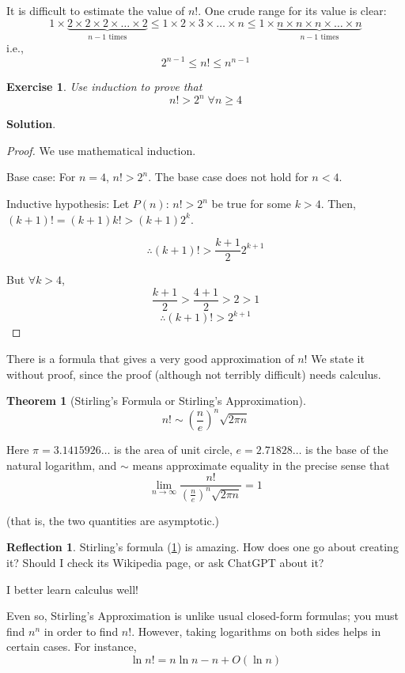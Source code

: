 \documentclass[11pt]{book}
\theoremstyle{definition}
\theoremstyle{plain}
\newtheorem{theorem}{Theorem}
\newtheorem{exercise}{Exercise}
\theoremstyle{definition}
\theoremstyle{problemstyle}
\theoremstyle{remark}
\theoremstyle{definition}
\newtheorem{reflection}{Reflection}
\begin{document}
It is difficult to estimate the value of $n!$. One crude range for its value is clear:
\[
    1\times\underbrace{2\times2\times2\times\dots\times2}_{n-1\text{ times}}\leq1\times2\times3\times\dots\times n\leq 1\times\underbrace{n\times n\times n\times\dots\times n}_{n-1\text{ times}}
\]
i.e.,
\[
    2^{n-1}\leq n!\leq n^{n-1}
\]
\begin{exercise}
    \label{ex:2.2.2}
    Use induction to prove that
    \[
        n!>2^n\;\forall n\geq4
    \]
\end{exercise}
\textbf{Solution}.
\begin{proof}
    We use mathematical induction.

    Base case: For $n=4$, $n!>2^n$. The base case does not hold for $n<4$.

    Inductive hypothesis: Let $P(n)$: $n!>2^n$ be true for some $k>4$. Then, $(k+1)!=(k+1)k!>(k+1)2^k$.

    \[
        \therefore(k+1)!>\frac{k+1}{2}2^{k+1}
     \]

     But $\forall k>4$, 
     \[
         \frac{k+1}{2}>\frac{4+1}{2}>2>1
     \]
     \[
         \therefore(k+1)!>2^{k+1}
     \]
\end{proof}

There is a formula that gives a very good approximation of $n!$ We state it without proof, since the proof (although not terribly difficult) needs calculus.

\begin{theorem}[Stirling's Formula or Stirling's Approximation]
    \label{th:stirling-formula}
    \[
        n!\sim(\frac{n}{e})^n\sqrt{2{\pi}n}
    \]
\end{theorem}

    Here $\pi=3.1415926\dots$ is the area of unit circle, $e=2.71828\dots$ is the base of the natural logarithm, and $\sim$ means approximate equality in the precise sense that 
    \[
        \lim_{n\to\infty}\frac{n!}{(\frac{n}{e})^n\sqrt{2{\pi}n}}=1
    \]

    (that is, the two quantities are asymptotic.)

\begin{reflection}
    Stirling's formula (\ref{th:stirling-formula}) is amazing. How does one go about creating it? Should I check its Wikipedia page, or ask ChatGPT about it?

    I better learn calculus well!

    Even so, Stirling's Approximation is unlike usual closed-form formulas; you must find $n^n$ in order to find $n!$. However, taking logarithms on both sides helps in certain cases. For instance, 
    \[
        \ln{n!}=n\ln{n}-n+O(\ln{n})
    \]
\end{reflection}
\end{document}
